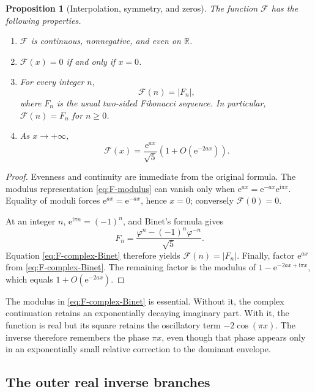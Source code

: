 \documentclass[11pt,oneside]{article}
\theoremstyle{plain}
\newtheorem{proposition}[theorem]{Proposition}
\theoremstyle{definition}
\theoremstyle{remark}
\newcommand{\e}{\mathrm{e}}
\newcommand{\ii}{\mathrm{i}}
\newcommand{\R}{\mathbb{R}}
\newcommand{\Fcal}{\mathcal{F}}
\newcommand{\phig}{\varphi}
\newcommand{\abs}[1]{\left\lvert#1\right\rvert}
\begin{document}
\begin{proposition}[Interpolation, symmetry, and zeros]
\label{prop:basic-F}
The function \(\Fcal\) has the following properties.
\begin{enumerate}
\item \(\Fcal\) is continuous, nonnegative, and even on \(\R\).
\item \(\Fcal(x)=0\) if and only if \(x=0\).
\item For every integer \(n\),
\begin{equation}
 \Fcal(n)=\abs{F_n},
 \label{eq:integer-interpolation}
\end{equation}
where \(F_n\) is the usual two-sided Fibonacci sequence.  In particular,
\(\Fcal(n)=F_n\) for \(n\ge0\).
\item As \(x\to+\infty\),
\begin{equation}
 \Fcal(x)=\frac{\e^{ax}}{\sqrt5}
 \left(1+O(\e^{-2ax})\right).
 \label{eq:F-envelope}
\end{equation}
\end{enumerate}
\end{proposition}

\begin{proof}
Evenness and continuity are immediate from the original formula.  The modulus
representation \eqref{eq:F-modulus} can vanish only when
\(\e^{ax}=\e^{-ax}\e^{\ii\pi x}\).  Equality of moduli forces
\(\e^{ax}=\e^{-ax}\), hence \(x=0\); conversely \(\Fcal(0)=0\).

At an integer \(n\), \(\e^{\ii\pi n}=(-1)^n\), and Binet's formula gives
\[
 F_n=\frac{\phig^n-(-1)^n\phig^{-n}}{\sqrt5}.
\]
Equation \eqref{eq:F-complex-Binet} therefore yields
\(\Fcal(n)=\abs{F_n}\).  Finally, factor \(\e^{ax}\) from
\eqref{eq:F-complex-Binet}.  The remaining factor is the modulus of
\(1-\e^{-2ax+\ii\pi x}\), which equals \(1+O(\e^{-2ax})\).
\end{proof}

The modulus in \eqref{eq:F-complex-Binet} is essential.  Without it, the
complex continuation retains an exponentially decaying imaginary part.  With
it, the function is real but its square retains the oscillatory term
\(-2\cos(\pi x)\).  The inverse therefore remembers the phase \(\pi x\), even
though that phase appears only in an exponentially small relative correction
to the dominant envelope.

\subsection{The outer real inverse branches}
\end{document}
